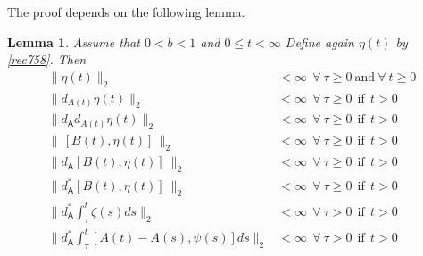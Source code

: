 \documentclass[12pt]{article}
\newtheorem{lemma}[theorem]{Lemma}
\def \As{\mathsf{A}}
\def \eref{\eqref}
\numberwithin{equation}{section}
\begin{document}
 
The proof depends on the following  lemma.
 

\begin{lemma}\label{lemrec5} 
 Assume that $0 < b <1$ and $0 \le t < \infty$   
 Define again $\eta(t)$  by \eref{rec758}. Then
\begin{align}
\|\eta(t)\|_2 &< \infty\ \ \forall\  \tau \ge 0  \ \text{and}\ \forall\  t\ge 0                    \label{rec790} \\
\| d_{A(t)} \eta(t)\|_2 &< \infty\ \ \forall\  \tau \ge 0 \ \ \text{if}\  \  t >0                \label{rec791}\\
\|d_\As  d_{A(t)} \eta(t)\|_2 &< \infty \ \ \forall \  \tau \ge 0 \ \ \text{if}\ \  t >0       \label{rec792}\\
\|\, [ B(t), \eta(t)]\, \|_2 & < \infty       \ \ \forall \  \tau \ge 0 \ \ \text{if}\  \ t >0      \label{rec795.0}\\
\|d_\As [ B(t), \eta(t)] \ \|_2   &< \infty \ \ \forall \   \tau \ge 0  \ \ \text{if}\  \ t >0    \label{rec795} \\
\|d_\As^* [ B(t), \eta(t)] \ \|_2  & < \infty \ \ \forall\   \tau \ge 0  \ \ \text{if}\  \ t >0   \label{rec796} \\
\| d_\As^*\int_\tau^t \zeta(s) ds \|_2 &< \infty\ \ \forall\  \tau > 0  \ \ \text{if}\  \ t >0   \label{rec793}\\
\| d_\As^*\int_\tau^t [A(t) - A(s), \psi(s)]ds \|_2 &< \infty\ \ \forall\  \tau > 0 \ \ \text{if}\  \ t >0 \label{rec794}
\end{align}
\end{lemma} 
\end{document}

